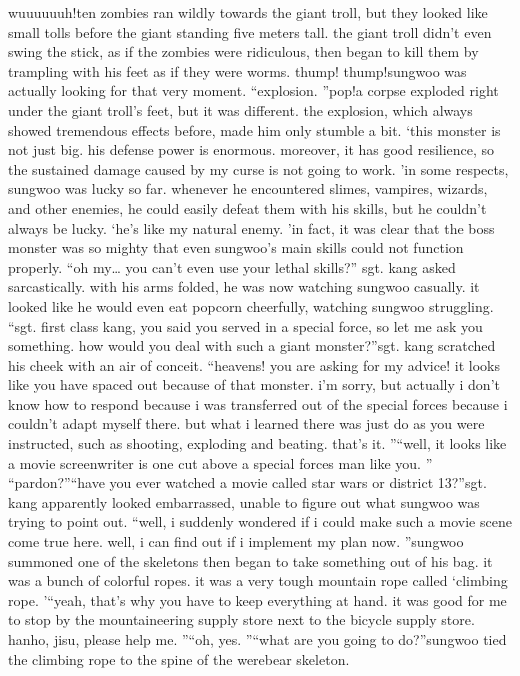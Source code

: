 wuuuuuuh!ten zombies ran wildly towards the giant troll, but they looked like small tolls before the giant standing five meters tall.
the giant troll didn’t even swing the stick, as if the zombies were ridiculous, then began to kill them by trampling with his feet as if they were worms.
thump! thump!sungwoo was actually looking for that very moment.
“explosion.
”pop!a corpse exploded right under the giant troll’s feet, but it was different.
 the explosion, which always showed tremendous effects before, made him only stumble a bit.
‘this monster is not just big.
 his defense power is enormous.
 moreover, it has good resilience, so the sustained damage caused by my curse is not going to work.
’in some respects, sungwoo was lucky so far.
 whenever he encountered slimes, vampires, wizards, and other enemies, he could easily defeat them with his skills, but he couldn’t always be lucky.
‘he’s like my natural enemy.
’in fact, it was clear that the boss monster was so mighty that even sungwoo’s main skills could not function properly.
“oh my… you can’t even use your lethal skills?” sgt.
 kang asked sarcastically.
with his arms folded, he was now watching sungwoo casually.
 it looked like he would even eat popcorn cheerfully, watching sungwoo struggling.
“sgt.
 first class kang, you said you served in a special force, so let me ask you something.
 how would you deal with such a giant monster?”sgt.
 kang scratched his cheek with an air of conceit.
“heavens! you are asking for my advice! it looks like you have spaced out because of that monster.
 i’m sorry, but actually i don’t know how to respond because i was transferred out of the special forces because i couldn’t adapt myself there.
 but what i learned there was just do as you were instructed, such as shooting, exploding and beating.
 that’s it.
”“well, it looks like a movie screenwriter is one cut above a special forces man like you.
”
“pardon?”“have you ever watched a movie called star wars or district 13?”sgt.
 kang apparently looked embarrassed, unable to figure out what sungwoo was trying to point out.
“well, i suddenly wondered if i could make such a movie scene come true here.
 well, i can find out if i implement my plan now.
”sungwoo summoned one of the skeletons then began to take something out of his bag.
it was a bunch of colorful ropes.
 it was a very tough mountain rope called ‘climbing rope.
’“yeah, that’s why you have to keep everything at hand.
 it was good for me to stop by the mountaineering supply store next to the bicycle supply store.
 hanho, jisu, please help me.
”“oh, yes.
”“what are you going to do?”sungwoo tied the climbing rope to the spine of the werebear skeleton.
